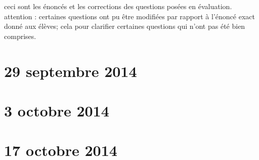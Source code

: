 

\begin{center}
    ceci sont les énoncés et les corrections des questions posées en évaluation. attention : certaines questions ont pu être modifiées par rapport à l'énoncé exact donné aux élèves; cela pour clarifier certaines questions qui n'ont pas été bien comprises.
\end{center}


\section{29 septembre 2014}


\section{3 octobre 2014}


\section{17 octobre 2014}


